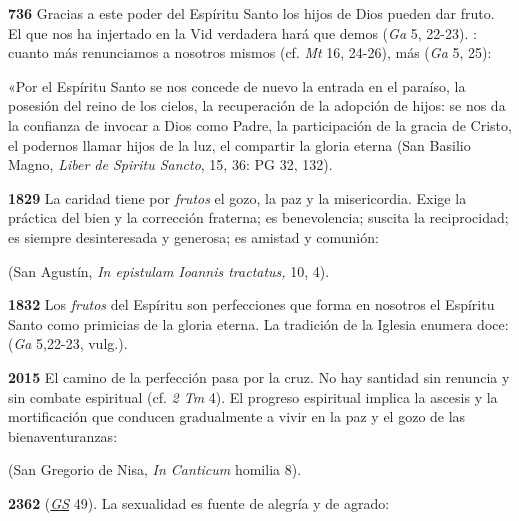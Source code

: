 \textbf{736} Gracias a este poder del Espíritu Santo los hijos de Dios pueden dar fruto. El que nos ha injertado en la Vid verdadera hará que demos  (\emph{Ga} 5, 22-23). : cuanto más renunciamos a nosotros mismos (cf. \emph{Mt} 16, 24-26), más  (\emph{Ga} 5, 25):

«Por el Espíritu Santo se nos concede de nuevo la entrada en el paraíso, la posesión del reino de los cielos, la recuperación de la adopción de hijos: se nos da la confianza de invocar a Dios como Padre, la participación de la gracia de Cristo, el podernos llamar hijos de la luz, el compartir la gloria eterna (San Basilio Magno, \emph{Liber de Spiritu Sancto}, 15, 36: PG 32, 132).

\textbf{1829} La caridad tiene por \emph{frutos} el gozo, la paz y la misericordia. Exige la práctica del bien y la corrección fraterna; es benevolencia; suscita la reciprocidad; es siempre desinteresada y generosa; es amistad y comunión:

 (San Agustín, \emph{In epistulam Ioannis tractatus,} 10, 4).

\textbf{1832} Los \emph{frutos} del Espíritu son perfecciones que forma en nosotros el Espíritu Santo como primicias de la gloria eterna. La tradición de la Iglesia enumera doce:  (\emph{Ga} 5,22-23, vulg.).

\textbf{2015} El camino de la perfección pasa por la cruz. No hay santidad sin renuncia y sin combate espiritual (cf. \emph{2 Tm} 4). El progreso espiritual implica la ascesis y la mortificación que conducen gradualmente a vivir en la paz y el gozo de las bienaventuranzas:

 (San Gregorio de Nisa, \emph{In Canticum} homilia 8).

\textbf{2362}  (\href{http://www.vatican.va/archive/hist_councils/ii_vatican_council/documents/vat-ii_const_19651207_gaudium-et-spes_sp.html}{\emph{GS}} 49). La sexualidad es fuente de alegría y de agrado:

